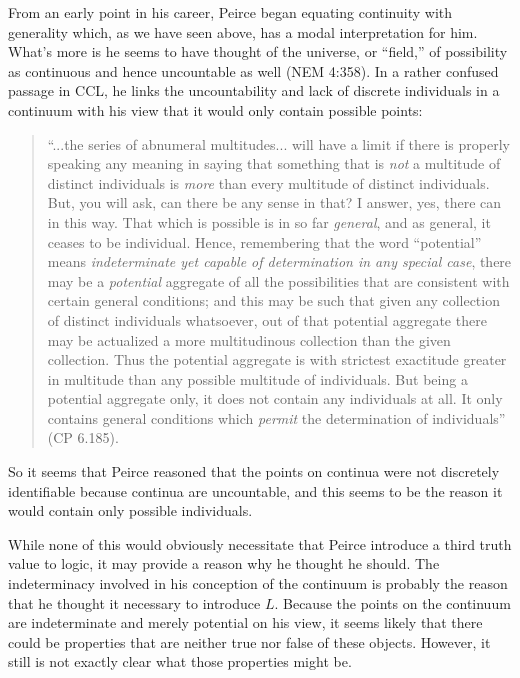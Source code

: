 From an early point in his career, Peirce began equating continuity with generality which, as we have seen above, has a modal interpretation for him. What's more is he seems to have thought of the universe, or ``field,'' of possibility as continuous and hence uncountable as well (NEM 4:358). In a rather confused passage in CCL, he links the uncountability and lack of discrete individuals in a continuum with his view that it would only contain possible points:
\begin{quotation}
\noindent ``...the series of abnumeral multitudes... will have a limit if there is properly speaking any meaning in saying that something that is \textit{not} a multitude of distinct individuals is \textit{more} than every multitude of distinct individuals. But, you will ask, can there be any sense in that? I answer, yes, there can in this way. That which is possible is in so far \textit{general}, and as general, it ceases to be individual. Hence, remembering that the word ``potential'' means \textit{indeterminate yet capable of determination in any special case}, there may be a \textit{potential} aggregate of all the possibilities that are consistent with certain general conditions; and this may be such that given any collection of distinct individuals whatsoever, out of that potential aggregate there may be actualized a more multitudinous collection than the given collection. Thus the potential aggregate is with strictest exactitude greater in multitude than any possible multitude of individuals. But being a potential aggregate only, it does not contain any individuals at all. It only contains general conditions which \textit{permit} the determination of individuals'' (CP 6.185).
\end{quotation}
\noindent So it seems that Peirce reasoned that the points on continua were not discretely identifiable because continua are uncountable, and this seems to be the reason it would contain only possible individuals.

While none of this would obviously necessitate that Peirce introduce a third truth value to logic, it may provide a reason why he thought he should. The indeterminacy involved in his conception of the continuum is probably the reason that he thought it necessary to introduce $L$. Because the points on the continuum are indeterminate and merely potential on his view, it seems likely that there could be properties that are neither true nor false of these objects. However, it still is not exactly clear what those properties might be.

